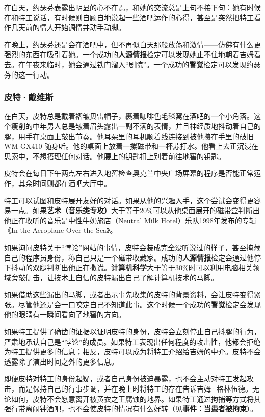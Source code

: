 在白天，约瑟芬表露出明显的心不在焉，和她的交流总是上句不接下句：她有时候在和特工说话，有时候则自顾自地说起一些酒吧运作的心得，甚至是突然把特工看作几天前的情人开始调情并动手动脚。

在晚上，约瑟芬还是会在酒吧中，但不再似白天那般放荡和激情——仿佛有什么更强烈的东西在吸引着她。一个成功的\textbf{人源情报}检定可以发现她止不住地朝着吉姆看去。在午夜来临时，她会通过铁门溜入“剧院”。一个成功的\textbf{警觉}检定可以发现约瑟芬的这一行动。

\subsubsection{皮特·戴维斯}
在白天，皮特总是戴着褶皱贝雷帽子，裹着咖啡色毛毯窝在酒吧的一个小角落。这个瘦削的中年男人总是皱着眉头露出一副不满的表情，并且神经质地抖动着自己的腿，用手在桌面上敲出节奏。他耳朵里的耳机顺着线连接到被他攥在手里的破旧 WM-GX410 随身听。他的桌面上放着一摞磁带和一杯苏打水。他看上去正沉浸在思索中，不想搭理任何对话。他腰上的钥匙扣上别着前往地窖的钥匙。

皮特会在每日下午两点左右进入地窖检查奥克兰中央广场屏幕的程序是否能正常运作，其余时间则都在酒吧大厅中。

特工可以试图和皮特展开友好的对话。如果从他的兴趣入手，这个尝试会变得更容易一点。如果\textbf{艺术（音乐类专攻）}大于等于20\%可以从他桌面展开的磁带盒判断出他正在收听的音乐是中性牛奶旅店（Neutral Milk Hotel）乐队1998年发布的专辑《In the Aeroplane Over the Sea》。

如果询问皮特关于“悖论”网站的事情，皮特会装成完全没听说过的样子，甚至掩藏自己的程序员身份，称自己只是一个磁带收藏家。成功的\textbf{人源情报}检定会通过他停下抖动的双腿判断出他正在撒谎。\textbf{计算机科学}大于等于30\%时可以利用电脑相关领域旁敲侧击，让技术上自信的皮特漏出自己了解计算机技术的马脚。

如果借助这些漏出的马脚，或者出示事先收集的皮特的背景资料，会让皮特变得紧张。尽管他还是会一口咬定自己不知道此事。这个时候一个成功的\textbf{警觉}检定会发现他的眼睛有一瞬间看向了地窖的方向。

如果特工提供了确凿的证据以证明皮特的身份，皮特会立刻停止自己抖腿的行为，严肃地承认自己是“悖论”的成员。如果特工表现出任何程度的攻击性，他都会拒绝为特工提供更多的信息；相反，皮特可以成为将特工介绍给吉姆的中介。皮特不会透露除了演出时间之外的更多信息。

即便皮特对特工的身份起疑，或者自己身份被迫暴露，也不会主动对特工发起攻击，而是保持自己的行事步调，并在晚上时将特工的存在告诉吉姆·格林伍德。无论如何，皮特不会愿意离开被黄衣之王腐蚀的地界。如果特工通过拘捕等方式将其强行带离闹钟酒吧，也不会使皮特的情况有什么好转（见\textbf{事件：当患者被拘束}）。

